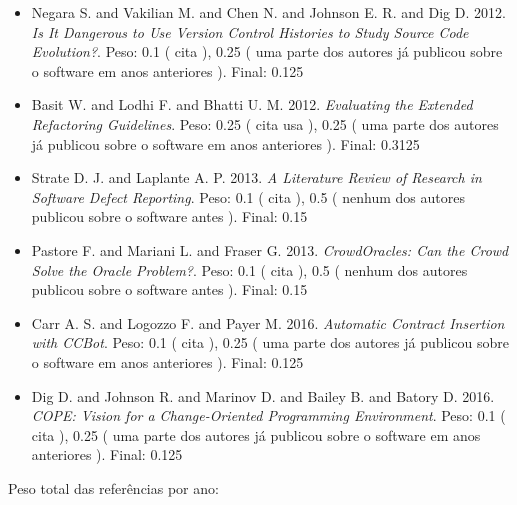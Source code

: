 \begin{itemize}
\item Negara S. and Vakilian M. and Chen N. and Johnson E. R. and Dig D.
      2012.
        \textit{ Is It Dangerous to Use Version Control Histories to Study Source Code Evolution?}.
      Peso:
      0.1 (
          cita
      ),
      0.25 (
uma parte dos autores já publicou sobre o software em anos anteriores
      ).
      Final:
      0.125

\item Basit W. and Lodhi F. and Bhatti U. M.
      2012.
        \textit{ Evaluating the Extended Refactoring Guidelines}.
      Peso:
      0.25 (
          cita
          usa
      ),
      0.25 (
uma parte dos autores já publicou sobre o software em anos anteriores
      ).
      Final:
      0.3125

\item Strate D. J. and Laplante A. P.
      2013.
        \textit{ A Literature Review of Research in Software Defect Reporting}.
      Peso:
      0.1 (
          cita
      ),
      0.5 (
nenhum dos autores publicou sobre o software antes
      ).
      Final:
      0.15

\item Pastore F. and Mariani L. and Fraser G.
      2013.
        \textit{ CrowdOracles: Can the Crowd Solve the Oracle Problem?}.
      Peso:
      0.1 (
          cita
      ),
      0.5 (
nenhum dos autores publicou sobre o software antes
      ).
      Final:
      0.15

\item Carr A. S. and Logozzo F. and Payer M.
      2016.
        \textit{ Automatic Contract Insertion with CCBot}.
      Peso:
      0.1 (
          cita
      ),
      0.25 (
uma parte dos autores já publicou sobre o software em anos anteriores
      ).
      Final:
      0.125

\item Dig D. and Johnson R. and Marinov D. and Bailey B. and Batory D.
      2016.
        \textit{ COPE: Vision for a Change-Oriented Programming Environment}.
      Peso:
      0.1 (
          cita
      ),
      0.25 (
uma parte dos autores já publicou sobre o software em anos anteriores
      ).
      Final:
      0.125

\end{itemize}

Peso total das referências por ano:

